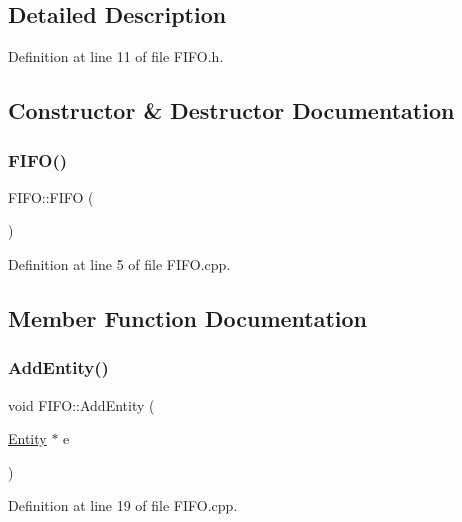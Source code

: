 \subsection{Detailed Description}


Definition at line 11 of file F\+I\+F\+O.\+h.



\subsection{Constructor \& Destructor Documentation}
\mbox{\label{class_f_i_f_o_aea969385961885a8e70732482d64fead}} 
\subsubsection{\texorpdfstring{F\+I\+F\+O()}{FIFO()}}
{\footnotesize\ttfamily F\+I\+F\+O\+::\+F\+I\+FO (\begin{DoxyParamCaption}{ }\end{DoxyParamCaption})}



Definition at line 5 of file F\+I\+F\+O.\+cpp.



\subsection{Member Function Documentation}
\mbox{\label{class_f_i_f_o_a7255ba93981ed0662bc4c26d9983dc9e}} 
\subsubsection{\texorpdfstring{Add\+Entity()}{AddEntity()}}
{\footnotesize\ttfamily void F\+I\+F\+O\+::\+Add\+Entity (\begin{DoxyParamCaption}\item[{\hyperlink{class_entity}{Entity} $\ast$}]{e }\end{DoxyParamCaption})}



Definition at line 19 of file F\+I\+F\+O.\+cpp.

